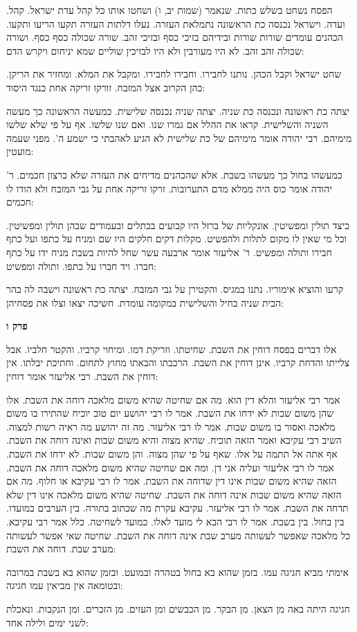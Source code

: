\documentclass[12pt, openany]{book}
\newcommand{\sethebfont}{
\fontsize{10.5pt}{21.0pt} \selectfont
}
\newcommand{\textblock}[1]{
{\sethebfont #1\\}	
}
\newcommand{\sectname}{}
\newcommand{\newsection}[1]{
	\addcontentsline{toc}{section}{#1}
	\renewcommand{\sectname}{#1}	
	\vspace{-\baselineskip}
	\begin{center}
		\textbf{%
\fontsize{16pt}{16pt}\selectfont
			#1}
	\end{center}
	\vspace{-\baselineskip}
	\nopagebreak
}
\begin{document}
\textblock{הפסח נשחט בשלש כתות. שנאמר (שמות יב, ו) ושחטו אותו כל קהל עדת ישראל. קהל. ועדה. וישראל נכנסה כת הראשונה נתמלאת העזרה. נעלו דלתות העזרה תקעו הריעו ותקעו. הכהנים עומדים שורות שורות ובידיהם בזיכי כסף ובזיכי זהב. שורה שכולה כסף כסף. ושורה שכולה זהב זהב. לא היו מעורבין ולא היו לבזיכין שוליים שמא יניחום ויקרש הדם:  }
\textblock{שחט ישראל וקבל הכהן. נותנו לחבירו. וחבירו לחבירו. ומקבל את המלא. ומחזיר את הריקן. כהן הקרוב אצל המזבח. זורקו זריקה אחת כנגד היסוד:  }
\textblock{יצתה כת ראשונה ונכנסה כת שניה. יצתה שניה נכנסה שלישית. כמעשה הראשונה כך מעשה השניה והשלישית. קראו את ההלל אם גמרו שנו. ואם שנו שלשו. אף על פי שלא שלשו מימיהם. רבי יהודה אומר מימיהם של כת שלישית לא הגיע לאהבתי כי ישמע ה'. מפני שעמה מועטין:  }
\textblock{כמעשהו בחול כך מעשהו בשבת. אלא שהכהנים מדיחים את העזרה שלא כרצון חכמים. ר' יהודה אומר כוס היה ממלא מדם התערובות. זרקו זריקה אחת על גבי המזבח ולא הודו לו חכמים:  }
\textblock{כיצד תולין ומפשיטין. אונקליות של ברזל היו קבועים בכתלים ובעמודים שבהן תולין ומפשיטין. וכל מי שאין לו מקום לתלות ולהפשיט. מקלות דקים חלקים היו שם ומניח על כתפו ועל כתף חבירו ותולה ומפשיט. ר' אליעזר אומר ארבעה עשר שחל להיות בשבת מניח ידו על כתף חברו. ויד חברו על כתפו. ותולה ומפשיט:  }
\textblock{קרעו והוציא אימוריו. נתנו במגיס. והקטירן על גבי המזבח. יצתה כת ראשונה וישבה לה בהר הבית שניה בחיל והשלישית במקומה עומדת. חשיכה יצאו וצלו את פסחיהן:  }
\newsection{פרק ו}
\textblock{אלו דברים בפסח דוחין את השבת. שחיטתו. וזריקת דמו. ומיחוי קרביו. והקטר חלביו. אבל צלייתו והדחת קרביו. אינן דוחין את השבת. הרכבתו והבאתו מחוץ לתחום. וחתיכת יבלתו. אין דוחין את השבת. רבי אליעזר אומר דוחין:  }
\textblock{אמר רבי אליעזר והלא דין הוא. מה אם שחיטה שהיא משום מלאכה דוחה את השבת. אלו שהן משום שבות לא ידחו את השבת. אמר לו רבי יהושע יום טוב יוכיח שהתירו בו משום מלאכה ואסור בו משום שבות. אמר לו רבי אליעזר. מה זה יהושע מה ראיה רשות למצוה. השיב רבי עקיבא ואמר הזאה תוכיח. שהיא מצוה והיא משום שבות ואינה דוחה את השבת. אף אתה אל תתמה על אלו. שאף על פי שהן מצוה. והן משום שבות. לא ידחו את השבת. אמר לו רבי אליעזר ועליה אני דן. ומה אם שחיטה שהיא משום מלאכה דוחה את השבת. הזאה שהיא משום שבות אינו דין שדוחה את השבת. אמר לו רבי עקיבא או חלוף. מה אם הזאה שהיא משום שבות אינה דוחה את השבת. שחיטה שהיא משום מלאכה אינו דין שלא תדחה את השבת. אמר לו רבי אליעזר. עקיבא עקרת מה שכתוב בתורה. בין הערבים במועדו. בין בחול. בין בשבת. אמר לו רבי הבא לי מועד לאלו. כמועד לשחיטה. כלל אמר רבי עקיבא. כל מלאכה שאפשר לעשותה מערב שבת אינה דוחה את השבת. שחיטה שאי אפשר לעשותה מערב שבת. דוחה את השבת:  }
\textblock{אימתי מביא חגיגה עמו. בזמן שהוא בא בחול בטהרה ובמועט. ובזמן שהוא בא בשבת במרובה ובטומאה אין מביאין עמו חגיגה:  }
\textblock{חגיגה היתה באה מן הצאן. מן הבקר. מן הכבשים ומן העזים. מן הזכרים. ומן הנקבות. ונאכלת לשני ימים ולילה אחד:  }
\end{document}
